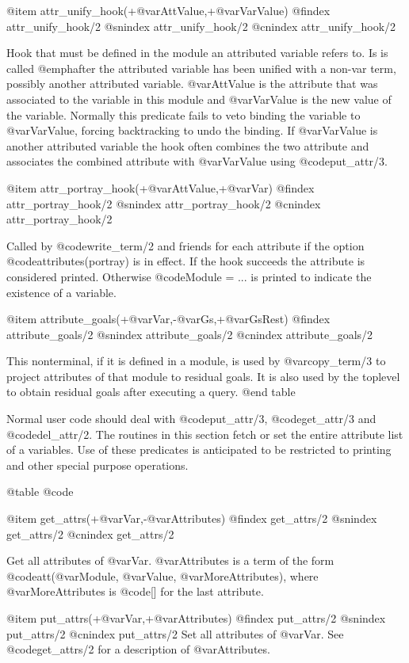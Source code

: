 @item attr_unify_hook(+@var{AttValue},+@var{VarValue})
@findex attr_unify_hook/2
@snindex attr_unify_hook/2
@cnindex attr_unify_hook/2

Hook that must be defined in the module an attributed variable refers
to. Is is called @emph{after} the attributed variable has been
unified with a non-var term, possibly another attributed variable.
@var{AttValue} is the attribute that was associated to the variable
in this module and @var{VarValue} is the new value of the variable.
Normally this predicate fails to veto binding the variable to
@var{VarValue}, forcing backtracking to undo the binding.  If
@var{VarValue} is another attributed variable the hook often combines
the two attribute and associates the combined attribute with
@var{VarValue} using @code{put_attr/3}.

@item attr_portray_hook(+@var{AttValue},+@var{Var})
@findex attr_portray_hook/2
@snindex attr_portray_hook/2
@cnindex attr_portray_hook/2

Called by @code{write_term/2} and friends for each attribute if the option
@code{attributes(portray)} is in effect.  If the hook succeeds the
attribute is considered printed.  Otherwise  @code{Module = ...} is
printed to indicate the existence of a variable.

@item attribute_goals(+@var{Var},-@var{Gs},+@var{GsRest})
@findex attribute_goals/2
@snindex attribute_goals/2
@cnindex attribute_goals/2

This nonterminal, if it is defined in a module, is used by @var{copy_term/3}
to project attributes of that module to residual goals. It is also
used by the toplevel to obtain residual goals after executing a query.
@end table

Normal user code should deal with @code{put_attr/3}, @code{get_attr/3} and @code{del_attr/2}.
The routines in this section fetch or set the entire attribute list of a
variables. Use of these predicates is anticipated to be restricted to
printing and other special purpose operations.

@table @code

@item get_attrs(+@var{Var},-@var{Attributes})
@findex get_attrs/2
@snindex get_attrs/2
@cnindex get_attrs/2

Get all attributes of @var{Var}. @var{Attributes} is a term of the form
@code{att(@var{Module}, @var{Value}, @var{MoreAttributes})}, where @var{MoreAttributes} is
@code{[]} for the last attribute.

@item put_attrs(+@var{Var},+@var{Attributes})
@findex put_attrs/2
@snindex put_attrs/2
@cnindex put_attrs/2
Set all attributes of @var{Var}.  See @code{get_attrs/2} for a description of
@var{Attributes}.

